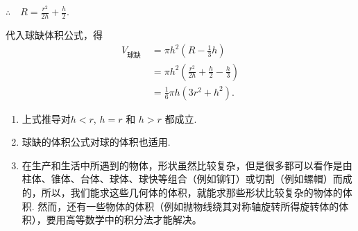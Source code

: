 $\therefore\quad R=\frac{r^{2}}{2h}+\frac{h}{2}$.

代入球缺体积公式，得
\[\begin{split}
V_{\text{球缺 }}&=\pi  h^{2}\left(R-\frac{1}{3}h\right)\\
&=\pi  h^{2}\left(\frac{r^{2}}{2h}+\frac{h}{2}-\frac{h}{3}\right)\\
&=\frac{1}{6}\pi  h\left(3r^{2}+h^{2}\right).    
\end{split}\]

\begin{remark}
\begin{enumerate}
    \item 上式推导对$h<r$,  $h=r$ 和 $h>r$ 都成立.
    \item 球缺的体积公式对球的体积也适用.
    \item  在生产和生活中所遇到的物体，形状虽然比较复杂，但是很多都可以看作是由柱体、锥体、台体、球体、球快等组合（例如铆钉）或切割（例如螺帽）而成的，所以，我们能求这些几何体的体积，就能求那些形状比较复杂的物体的体积. 然而，还有一些物体的体积（例如抛物线绕其对称轴旋转所得旋转体的体积），要用高等数学中的积分法才能解决。
\end{enumerate}
\end{remark}





